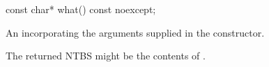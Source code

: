 \begin{itemdecl}
const char* what() const noexcept;
\end{itemdecl}

\begin{itemdescr}
\pnum
\returns An \ntbs incorporating the arguments supplied in the constructor.

\begin{note} The returned NTBS might be the contents of .\end{note}
\end{itemdescr}
